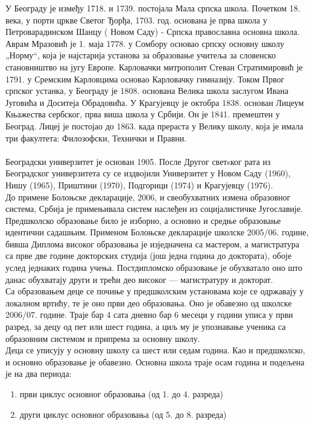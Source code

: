 \documentclass[12pt,twoside]{article}
\begin{document}
  У Београду је између 1718. и 1739. постојала Мала српска школа. Почетком 18. века, у порти цркве Светог Ђорђа, 1703. год. основана је прва школа у Петроварадинском Шанцу ( Новом Саду) - Српска православна основна школа. Аврам Мразовић је 1. маја 1778. у Сомбору основао српску основну школу „Норму“, која је најстарија установа за образовање учитеља за словенско становништво на југу Европе. Карловачки митрополит Стеван Стратимировић је 1791. у Сремским Карловцима основао Карловачку гимназију. Током Првог српског устанка, у Београду је 1808. основана Велика школа заслугом Ивана Југовића и Доситеја Обрадовића. У Крагујевцу је октобра 1838. основан Лицеум Књажества сербског, прва виша школа у Србији. Он је 1841. премештен у Београд. Лицеј је постојао до 1863. када прераста у Велику школу, која је имала три факултета: Филозофски, Технички и Правни.\\\\Београдски универзитет је основан 1905. После Другог све{т}sког рата из Београдског универзитета су се издвојили Универзитет у Новом Саду (1960), Нишу (1965), Приштини (1970), Подгорици (1974) и Крагујевцу (1976).\\До примене Болоњске декларације, 2006, и свеобухватних измена образовног система, Србија је примењивала систем наслеђен из социјалистичке Југославије. Предшколско образовање било је изборно, а основно и средње образовање идентични садашњим. Применом Болоњске декларације школске 2005/06. године, бивша Диплома високог образовања је изједначена са мастером, а магистратура са прве две године докторских студија (још једна година до доктората), обоје услед једнаких година учења. Постдипломско образовање је обухватало оно што данас обухватају други и трећи део високог — магистратуру и докторат.\\
  Са образовањем деце се почиње у предшколским установама које се одржавају у локалном вртићу, те је оно први део образовања. Оно је обавезно од школске 2006/07. године. Траје бар 4 сата дневно бар 6 месеци у години уписа у први разред, за децу од пет или шест година, а циљ му је упознавање ученика са образовним системом и припрема за основну школу.\\
  Деца се уписују у основну школу са шест или седам година. Као и предшколско, и основно образовање је обавезно. Основна школа траје осам година и подељена је на два периода:
\begin{enumerate}
    \item први циклус основног образовања (од 1. до 4. разреда)
    \item други циклус основног образовања (од 5. до 8. разреда)
\end{enumerate}
\end{document}
